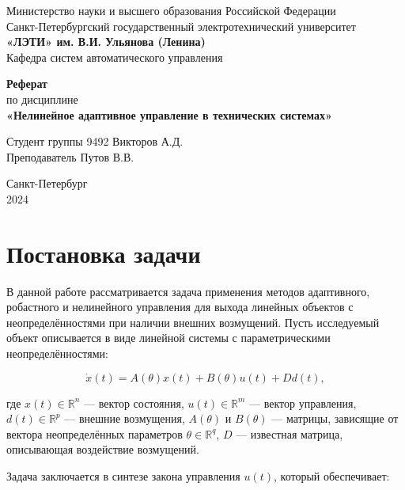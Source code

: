 \documentclass[a4paper,14pt]{extarticle} %
\begin{document}
\begin{titlepage}
    \begin{center}
        \large
        Министерство науки и высшего образования Российской Федерации \\
        Санкт-Петербургский государственный электротехнический университет \\
        \textbf{«ЛЭТИ» им. В.И. Ульянова (Ленина)} \\
        Кафедра систем автоматического управления

        \vfill

        \textbf{Реферат} \\
        по дисциплине \\
        \textbf{«Нелинейное адаптивное управление в технических системах»}

        \vfill

        Студент группы 9492 \hfill Викторов А.Д. \\
        Преподаватель \hfill Путов В.В.

        \vfill
        Санкт-Петербург \\
        2024
    \end{center}
\end{titlepage}

\setcounter{page}{2}
\tableofcontents

\newpage
\section{Постановка задачи}

В данной работе рассматривается задача применения методов адаптивного, робастного и нелинейного управления для выхода линейных объектов с неопределённостями при наличии внешних возмущений. Пусть исследуемый объект описывается в виде линейной системы с параметрическими неопределённостями:

\begin{equation}
    \dot{x}(t) = A(\theta)x(t) + B(\theta)u(t) + Dd(t),
\end{equation}

где \( x(t) \in \mathbb{R}^n \) — вектор состояния, \( u(t) \in \mathbb{R}^m \) — вектор управления, \( d(t) \in \mathbb{R}^p \) — внешние возмущения, \( A(\theta) \) и \( B(\theta) \) — матрицы, зависящие от вектора неопределённых параметров \( \theta \in \mathbb{R}^q \), \( D \) — известная матрица, описывающая воздействие возмущений.

Задача заключается в синтезе закона управления \( u(t) \), который обеспечивает:
\end{document}
